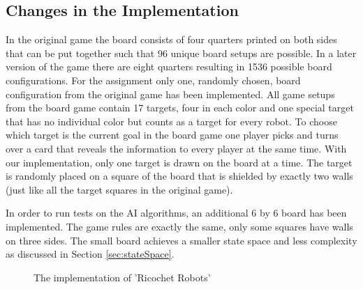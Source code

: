 \documentclass[a4paper,10pt]{article}
\begin{document}
\subsection{Changes in the Implementation}
In the original game the board consists of four quarters printed on both sides that can be put together such that 96 unique board setups are possible. In a later version of the
game there are eight quarters resulting in 1536 possible board configurations. For the assignment only one, randomly chosen, board configuration from the original game has been
implemented. All game setups from the board game contain 17 targets, four in each color and one special target that has no individual color but counts as a target for every
robot. To choose which target is the current goal in the board game one player picks and turns over a card that reveals the information to every player at the same time. With
our implementation, only one target is drawn on the board at a time. The target is randomly placed on a square of the board that is shielded by exactly two walls (just like all
the target squares in the original game).
\par
In order to run tests on the AI algorithms, an additional 6 by 6 board has been implemented. The game rules are exactly the same, only some squares have walls on three sides.
The small board achieves a smaller state space and less complexity as discussed in Section \ref{sec:stateSpace}.
\begin{figure}
\caption{The implementation of 'Ricochet Robots'}
\label{fig:implementation}
\end{figure}
\end{document}

